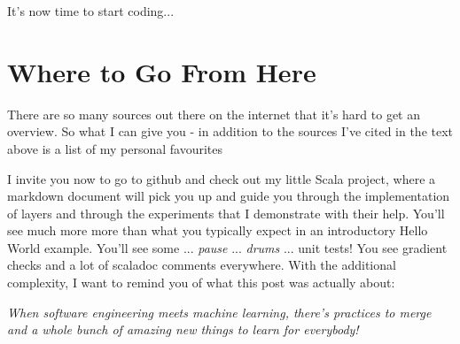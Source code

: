 \documentclass[]{report}
\begin{document}
\bigskip

It's now time to start coding...



\section{Where to Go From Here}

There are so many sources out there on the internet that it's hard to get an overview. So what I can give you  - in addition to the sources I've cited in the text above is a list of my personal favourites




I invite you now to go to github and check out my little Scala project, where a markdown document will pick you up and guide you through the implementation of layers and through the experiments that I demonstrate with their help. You'll see much more more than what you typically expect in an introductory Hello World example. You'll see some ... \emph{pause} ... \emph{drums} ... unit tests! You see gradient checks and a lot of scaladoc comments everywhere. With the additional complexity, I want to remind you of what this post was actually about:


\bigskip

\emph{When software engineering meets machine learning, there's practices to merge and a whole bunch of amazing new things to learn for everybody! }
\end{document}

